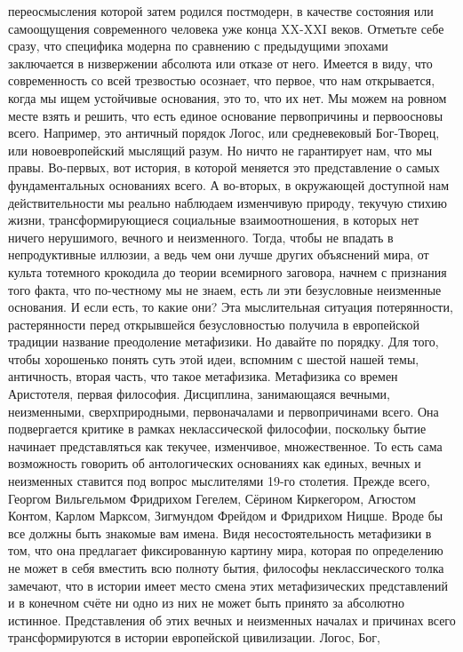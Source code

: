 переосмысления которой затем родился постмодерн, в качестве состояния или
самоощущения современного человека уже конца XX-XXI веков. Отметьте себе сразу,
что специфика модерна по сравнению с предыдущими эпохами заключается в
низвержении абсолюта или отказе от него. Имеется в виду, что современность со
всей трезвостью осознает, что первое, что нам открывается, когда мы ищем
устойчивые основания, это то, что их нет. Мы можем на ровном месте взять и
решить, что есть единое основание первопричины и первоосновы всего. Например,
это античный порядок Логос, или средневековый Бог-Творец, или новоевропейский
мыслящий разум. Но ничто не гарантирует нам, что мы правы. Во-первых, вот
история, в которой меняется это представление о самых фундаментальных основаниях
всего. А во-вторых, в окружающей доступной нам действительности мы реально
наблюдаем изменчивую природу, текучую стихию жизни, трансформирующиеся
социальные взаимоотношения, в которых нет ничего нерушимого, вечного и
неизменного. Тогда, чтобы не впадать в непродуктивные иллюзии, а ведь чем они
лучше других объяснений мира, от культа тотемного крокодила до теории всемирного
заговора, начнем с признания того факта, что по-честному мы не знаем, есть ли
эти безусловные неизменные основания. И если есть, то какие они? Эта
мыслительная ситуация потерянности, растерянности перед открывшейся
безусловностью получила в европейской традиции название преодоление метафизики.
Но давайте по порядку. Для того, чтобы хорошенько понять суть этой идеи,
вспомним с шестой нашей темы, античность, вторая часть, что такое метафизика.
Метафизика со времен Аристотеля, первая философия. Дисциплина, занимающаяся
вечными, неизменными, сверхприродными, первоначалами и первопричинами всего. Она
подвергается критике в рамках неклассической философии, поскольку бытие начинает
представляться как текучее, изменчивое, множественное. То есть сама возможность
говорить об антологических основаниях как единых, вечных и неизменных ставится
под вопрос мыслителями 19-го столетия. Прежде всего, Георгом Вильгельмом
Фридрихом Гегелем, Сёрином Киркегором, Агюстом Контом, Карлом Марксом, Зигмундом
Фрейдом и Фридрихом Ницше. Вроде бы все должны быть знакомые вам имена. Видя
несостоятельность метафизики в том, что она предлагает фиксированную картину
мира, которая по определению не может в себя вместить всю полноту бытия,
философы неклассического толка замечают, что в истории имеет место смена этих
метафизических представлений и в конечном счёте ни одно из них не может быть
принято за абсолютно истинное. Представления об этих вечных и неизменных началах
и причинах всего трансформируются в истории европейской цивилизации. Логос, Бог,
